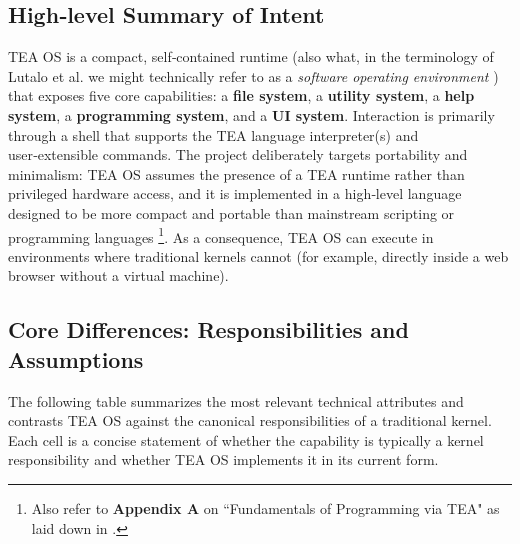 \documentclass{article}
\begin{document}
\subsection{High‑level Summary of Intent}

TEA OS is a compact, self‑contained runtime (also what, in the terminology of Lutalo et al. we might technically refer to as a \textit{software operating environment} \cite{lutalo2023dnapsoe}) that exposes five core capabilities: a \textbf{file system}, a \textbf{utility system}, a \textbf{help system}, a \textbf{programming system}, and a \textbf{UI system}.  Interaction is primarily through a shell that supports the TEA language interpreter(s) and user‑extensible commands.  The project deliberately targets portability and minimalism: TEA OS assumes the presence of a TEA runtime rather than privileged hardware access, and it is implemented in a high‑level language designed to be more compact and portable than mainstream scripting or programming languages \cite{Lutalo2024TEATAZ}\footnote{Also refer to \textbf{Appendix A} on ``Fundamentals of Programming via TEA" as laid down in \cite{Lutalo2024TEATAZ}.}.  As a consequence, TEA OS can execute in environments where traditional kernels cannot (for example, directly inside a web browser without a virtual machine).

\subsection{Core Differences: Responsibilities and Assumptions}

The following table summarizes the most relevant technical attributes and contrasts TEA OS against the canonical responsibilities of a traditional kernel.  Each cell is a concise statement of whether the capability is typically a kernel responsibility and whether TEA OS implements it in its current form.
\end{document}

